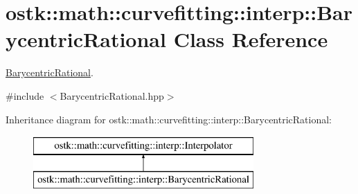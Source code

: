 \hypertarget{classostk_1_1math_1_1curvefitting_1_1interp_1_1_barycentric_rational}{}\section{ostk\+:\+:math\+:\+:curvefitting\+:\+:interp\+:\+:Barycentric\+Rational Class Reference}
\label{classostk_1_1math_1_1curvefitting_1_1interp_1_1_barycentric_rational}


\hyperlink{classostk_1_1math_1_1curvefitting_1_1interp_1_1_barycentric_rational}{Barycentric\+Rational}.  




{\ttfamily \#include $<$Barycentric\+Rational.\+hpp$>$}

Inheritance diagram for ostk\+:\+:math\+:\+:curvefitting\+:\+:interp\+:\+:Barycentric\+Rational\+:\begin{figure}[H]
\begin{center}
\leavevmode
\includegraphics[height=2.000000cm]{classostk_1_1math_1_1curvefitting_1_1interp_1_1_barycentric_rational}
\end{center}
\end{figure}
